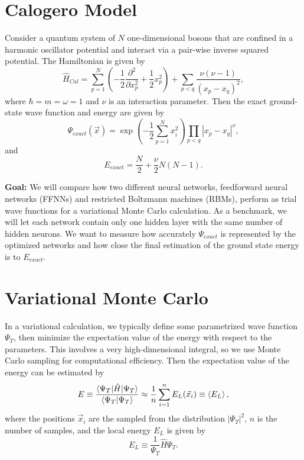 \documentclass[12pt]{article}
\begin{document}
\section{Calogero Model}

\noindent Consider a quantum system of $N$ one-dimensional bosons that are confined in a harmonic oscillator potential and interact via a pair-wise inverse squared potential. The Hamiltonian is given by
\begin{equation}
\hat{H}_{Cal} = \sum_{p=1}^{N} \left( -\frac{1}{2} \frac{\partial^2}{\partial x_p^2} + \frac{1}{2} x_p^2 \right) + \sum_{p<q} \frac{\nu (\nu -1)}{(x_p-x_q)^2},
\end{equation}
where $\hbar = m = \omega = 1$ and $\nu$ is an interaction parameter. Then the exact ground-state wave function and energy are given by
\begin{equation}
\Psi_{exact} (\vec{x}) = \exp \left( - \frac{1}{2} \sum_{p=1}^{N} x_i^2 \right) \prod_{p<q} |x_p-x_q|^\nu,
\end{equation}
and
\begin{equation}
E_{exact} = \frac{N}{2} + \frac{\nu}{2} N (N-1).
\end{equation}
\vspace{3mm}

\noindent \textbf{Goal:} We will compare how two different neural networks, feedforward neural networks (FFNNs) and restricted Boltzmann machines (RBMs),  perform as trial wave functions for a variational Monte Carlo calculation. As a benchmark, we will let each network contain only one hidden layer with the same number of hidden neurons. We want to measure how accurately $\Psi_{exact}$ is represented by the optimized networks and how close the final estimation of the ground state energy is to $E_{exact}$. 
\vspace{5mm}

\section{Variational Monte Carlo}

\noindent In a variational calculation, we typically define some parametrized wave function $\Psi_T$, then minimize the expectation value of the energy with respect to the parameters. This involves a very high-dimensional integral, so we use Monte Carlo sampling for computational efficiency. Then the expectation value of the energy can be estimated by
\begin{equation}
E \equiv \frac{\braket{\Psi_T | \hat{H} | \Psi_T}}{\braket{\Psi_T | \Psi_T}} \approx \frac{1}{n} \sum_{i=1}^{n} E_L (\vec{x}_i) \equiv \braket{E_L},
\end{equation}
where the positions $\vec{x}_i$ are the sampled from the distribution $|\Psi_T|^2$, $n$ is the number of samples, and the local energy $E_L$ is given by
\begin{equation}
E_L \equiv \frac{1}{\Psi_T} \hat{H} \Psi_T.
\end{equation}
\end{document}
